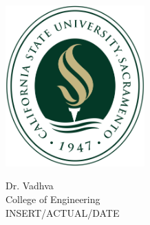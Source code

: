 \begin{titlepage}
\begin{center}
        \vspace{0.4cm}
        
        \includegraphics[width=0.4\textwidth]{Picture Files/1200px-California_State_University,_Sacramento_seal.svg.png}
        \large
        \par
        Dr. Vadhva\\
        College of Engineering\\
        INSERT/ACTUAL/DATE\\
    \end{center}
\end{titlepage}